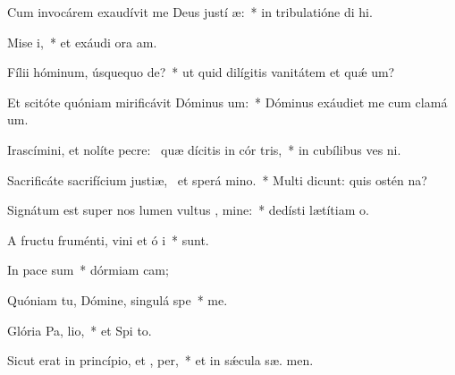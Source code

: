 \item Cum invocárem exaudívit me Deus justí æ:~* in tribulatióne di hi.
\item Mise i,~* et exáudi ora am.
\item Fílii hóminum, úsquequo  de?~* ut quid dilígitis vanitátem et quǽ um?
\item Et scitóte quóniam mirificávit Dóminus  um:~* Dóminus exáudiet me cum clamá  um.
\item Irascímini, et nolíte pecre:~\pscross{} quæ dícitis in cór tris,~* in cubílibus ves ni.
\item Sacrificáte sacrifícium justiæ,~\pscross{} et sperá  mino.~* Multi dicunt: quis ostén  na?
\item Signátum est super nos lumen vultus , mine:~* dedísti lætítiam   o.
\item A fructu fruménti, vini et ó i~*  sunt.
\item In pace  sum~* dórmiam  cam;
\item Quóniam tu, Dómine, singulá  spe~*  me.
\item Glória Pa,  lio,~* et Spi to.
\item Sicut erat in princípio, et ,  per,~* et in sǽcula sæ. men.
